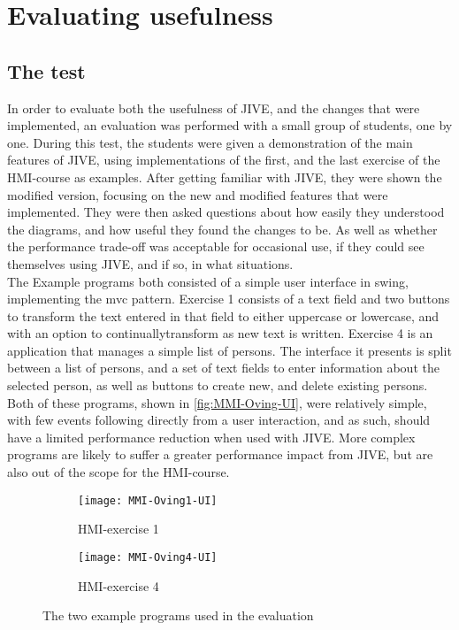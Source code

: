 \chapter{Evaluating usefulness}\label{jiveEval}
\section{The test}\label{jiveEvalTest}
In order to evaluate both the usefulness of JIVE, and the changes that were implemented, an evaluation was performed with a small group of students, one by one.
During this test, the students were given a demonstration of the main features of JIVE, using implementations of the first, and the last exercise of the HMI-course as examples.
After getting familiar with JIVE, they were shown the modified version, focusing on the new and modified features that were implemented.
They were then asked questions about how easily they understood the diagrams, and how useful they found the changes to be.
As well as whether the performance trade-off was acceptable for occasional use, if they could see themselves using JIVE, and if so, in what situations.
~\\

The Example programs both consisted of a simple user interface in swing, implementing the \gls{mvc} pattern.
Exercise 1 consists of a text field and two buttons to transform the text entered in that field to either uppercase or lowercase, and with an option to continuallytransform as new text is written.
Exercise 4 is an application that manages a simple list of persons.
The interface it presents is split between a list of persons, and a set of text fields to enter information about the selected person, as well as buttons to create new, and delete existing persons.
Both of these programs, shown in \autoref{fig:MMI-Oving-UI}, were relatively simple, with few events following directly from a user interaction, and as such, should have a limited performance reduction when used with JIVE.
More complex programs are likely to suffer a greater performance impact from JIVE, but are also out of the scope for the HMI-course.
~\\

\begin{figure}[H]
	\centering
	\begin{subfigure}{\textwidth}
		\centering
		\texttt{[image: MMI-Oving1-UI]}
		\caption{HMI-exercise 1}
		\label{fig:MMI-Oving1-UI}
	\end{subfigure}
	\begin{subfigure}{\textwidth}
		\centering
		\texttt{[image: MMI-Oving4-UI]}
		\caption{HMI-exercise 4}
		\label{fig:MMI-Oving4-UI}
	\end{subfigure}
	\caption{The two example programs used in the evaluation}
	\label{fig:MMI-Oving-UI}
\end{figure}


